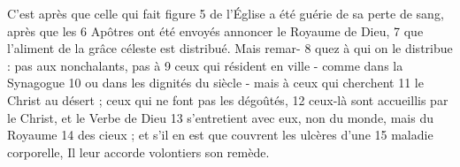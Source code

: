 C'est après que celle qui fait figure	 
5	 	de l'Église a été guérie de sa perte de sang, après que les	 
6	 	Apôtres ont été envoyés annoncer le Royaume de Dieu,	 
7	 	que l'aliment de la grâce céleste est distribué. Mais remar-	 
8	 	quez à qui on le distribue : pas aux nonchalants, pas à	 
9	 	ceux qui résident en ville - comme dans la Synagogue	 
10	 	ou dans les dignités du siècle - mais à ceux qui cherchent	 
11	 	le Christ au désert ; ceux qui ne font pas les dégoûtés,	 
12	 	ceux-là sont accueillis par le Christ, et le Verbe de Dieu	 
13	 	s'entretient avec eux, non du monde, mais du Royaume	 
14	 	des cieux ; et s'il en est que couvrent les ulcères d'une	 
15	 	maladie corporelle, Il leur accorde volontiers son remède.